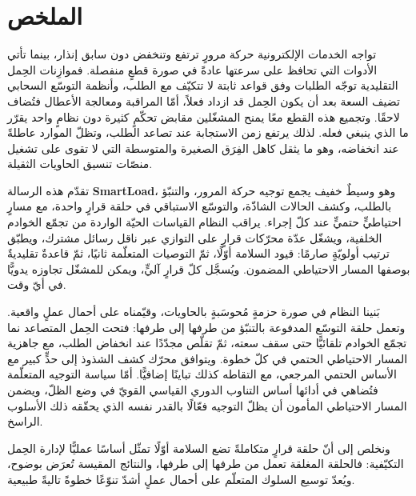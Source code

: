 \chapter*{\textarabic{الملخص}}

\begin{Arabic}
\begin{flushright}

تواجه الخدمات الإلكترونية حركة مرورٍ ترتفع وتنخفض دون سابق إنذار، بينما تأتي
الأدوات التي تحافظ على سرعتها عادةً في صورة قطعٍ منفصلة. فموازِنات الحِمل
التقليدية توجّه الطلبات وفق قواعد ثابتة لا تتكيّف مع الطلب، وأنظمة التوسّع
السحابي تضيف السعة بعد أن يكون الحِمل قد ازداد فعلاً، أمّا المراقبة ومعالجة
الأعطال فتُضاف لاحقًا. وتجميع هذه القطع معًا يمنح المشغّلين مقابض تحكّمٍ كثيرة
دون نظامٍ واحد يقرّر ما الذي ينبغي فعله. لذلك يرتفع زمن الاستجابة عند تصاعد
الطلب، وتظلّ الموارد عاطلةً عند انخفاضه، وهو ما يثقل كاهل الفِرَق الصغيرة
والمتوسطة التي لا تقوى على تشغيل منصّات تنسيق الحاويات الثقيلة.

تقدّم هذه الرسالة \textbf{SmartLoad}، وهو وسيطٌ خفيف يجمع توجيه حركة المرور،
والتنبّؤ بالطلب، وكشف الحالات الشاذّة، والتوسّع الاستباقي في حلقة قرارٍ واحدة،
مع مسارٍ احتياطيٍّ حتميٍّ عند كلّ إجراء. يراقب النظام القياسات الحيّة الواردة من
تجمّع الخوادم الخلفية، ويشغّل عدّة محرّكات قرارٍ على التوازي عبر ناقل رسائل
مشترك، ويطبّق ترتيب أولويّةٍ صارمًا: قيود السلامة أوّلًا، ثمّ التوصيات المتعلّمة
ثانيًا، ثمّ قاعدةٌ تقليديةٌ بوصفها المسار الاحتياطي المضمون. ويُسجَّل كلّ قرارٍ
آليٍّ، ويمكن للمشغّل تجاوزه يدويًّا في أيّ وقت.

بَنينا النظام في صورة حزمةٍ مُحوسَبةٍ بالحاويات، وقيّمناه على أحمال عملٍ واقعية.
وتعمل حلقة التوسّع المدفوعة بالتنبّؤ من طرفها إلى طرفها: فتحت الحِمل المتصاعد نما
تجمّع الخوادم تلقائيًّا حتى سقف سعته،
ثمّ تقلّص مجدّدًا عند انخفاض الطلب، مع جاهزية المسار الاحتياطي الحتمي في كلّ خطوة.
ويتوافق محرّك كشف الشذوذ إلى حدٍّ كبير مع الأساس الحتمي المرجعي،
مع التقاطه كذلك تباينًا إضافيًّا. أمّا سياسة التوجيه المتعلّمة فتُضاهي في أدائها
أساس التناوب الدوري القياسي القويّ في وضع الظلّ، ويضمن المسار الاحتياطي المأمون
أن يظلّ التوجيه فعّالًا بالقدر نفسه الذي يحقّقه ذلك الأسلوب الراسخ.

ونخلص إلى أنّ حلقة قرارٍ متكاملةً تضع السلامة أوّلًا تمثّل أساسًا عمليًّا لإدارة
الحِمل التكيّفية: فالحلقة المغلقة تعمل من طرفها إلى طرفها، والنتائج المقيسة
تُعرَض بوضوح، ويُعدّ توسيع السلوك المتعلّم على أحمال عملٍ أشدّ تنوّعًا خطوةً
تاليةً طبيعية.

\end{flushright}
\end{Arabic}

\clearpage
